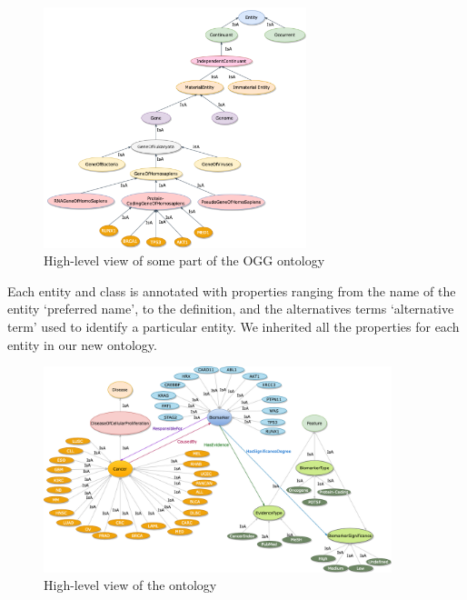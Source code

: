 \vspace{-2mm}
\begin{figure}
	\centering
	\includegraphics[width=0.7\linewidth,height=70mm]{images/go.png}
	\caption{High-level view of some part of the OGG ontology} 
	\label{fig:ogg_ontology}
	\vspace{-2mm}
\end{figure}

\vspace{-2mm}
\hspace*{3.5mm} Each entity and class is annotated with properties ranging from the name of the entity `preferred name', to the definition, and the alternatives terms `alternative term' used to identify a particular entity. We inherited all the properties for each entity in our new ontology.

\begin{figure}
	\centering
	\includegraphics[width=0.8\linewidth,height=60mm]{images/diagram_general_view.png}
	\caption{High-level view of the ontology} 
	\label{fig:main_ontology}
\end{figure}

